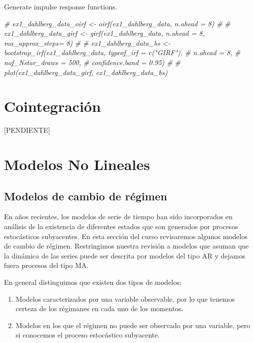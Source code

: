\documentclass[
]{book}
\newenvironment{Shaded}{\begin{snugshade}}{\end{snugshade}}
\newcommand{\CommentTok}[1]{\textcolor[rgb]{0.56,0.35,0.01}{\textit{#1}}}
\begin{document}
Generate impulse response functions.

\begin{Shaded}
\begin{Highlighting}[]
\CommentTok{\# ex1\_dahlberg\_data\_oirf \textless{}{-}  oirf(ex1\_dahlberg\_data, n.ahead = 8)}
\CommentTok{\# }
\CommentTok{\# ex1\_dahlberg\_data\_girf \textless{}{-}  girf(ex1\_dahlberg\_data, n.ahead = 8, ma\_approx\_steps= 8)}
\CommentTok{\# }
\CommentTok{\# ex1\_dahlberg\_data\_bs \textless{}{-}  bootstrap\_irf(ex1\_dahlberg\_data, typeof\_irf = c("GIRF"),}
\CommentTok{\#                                        n.ahead = 8,}
\CommentTok{\#                                        nof\_Nstar\_draws = 500,}
\CommentTok{\#                                        confidence.band = 0.95)}
\CommentTok{\# }
\CommentTok{\# plot(ex1\_dahlberg\_data\_girf, ex1\_dahlberg\_data\_bs)}
\end{Highlighting}
\end{Shaded}

\hypertarget{cointegraciuxf3n-1}{%
\section{Cointegración}\label{cointegraciuxf3n-1}}

{[}PENDIENTE{]}

\hypertarget{modelos-no-lineales}{%
\section{Modelos No Lineales}\label{modelos-no-lineales}}

\hypertarget{modelos-de-cambio-de-ruxe9gimen}{%
\subsection{Modelos de cambio de régimen}\label{modelos-de-cambio-de-ruxe9gimen}}

En años recientes, los modelos de serie de tiempo han sido incorporados en análisis de la existencia de diferentes estados que son generados por procesos estocásticos subyacentes. En esta sección del curso revisaremos algunos modelos de cambio de régimen. Restringimos nuestra revisión a modelos que asuman que la dinámica de las series puede ser descrita por modelos del tipo AR y dejamos fuera procesos del tipo MA.

En general distinguimos que existen dos tipos de modelos:

\begin{enumerate}
    \item Modelos caracterizados por una variable observable, por lo que tenemos certeza de los régimanes en cada uno de los momentos.
    
    \item Modelos en los que el régimen no puede ser observado por una variable, pero si conocemos el proceso estocástico subyacente. 
\end{enumerate}
\end{document}
